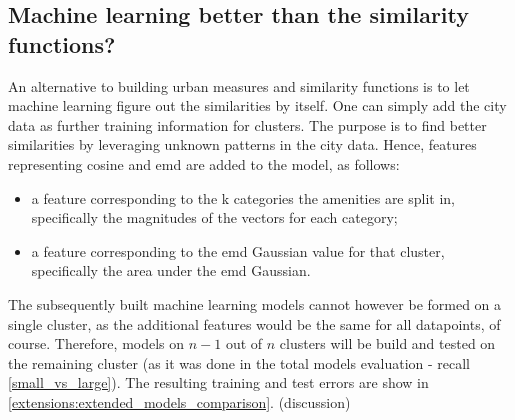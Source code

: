 {\subsection{Machine learning better than the similarity functions?}
\label{extensions:machine_learning_better}
An alternative to building urban measures and similarity functions is to let machine learning figure out the similarities by itself. One can simply add the city data as further training information for clusters. The purpose is to find better similarities by leveraging unknown patterns in the city data. Hence, features representing cosine and emd are added to the model, as follows: 
\begin{itemize}
	\item a feature corresponding to the k categories the amenities are split in, specifically the magnitudes of the vectors for each category;
	\item a feature corresponding to the emd Gaussian value for that cluster, specifically the area under the emd Gaussian.
\end{itemize}
The subsequently built machine learning models cannot however be formed on a single cluster, as the additional features would be the same for all datapoints, of course. Therefore, models on $n-1$ out of $n$ clusters will be build and tested on the remaining cluster (as it was done in the total models evaluation - recall \autoref{small_vs_large}). The resulting training and test errors are show in \autoref{extensions:extended_models_comparison}. (discussion)

}
